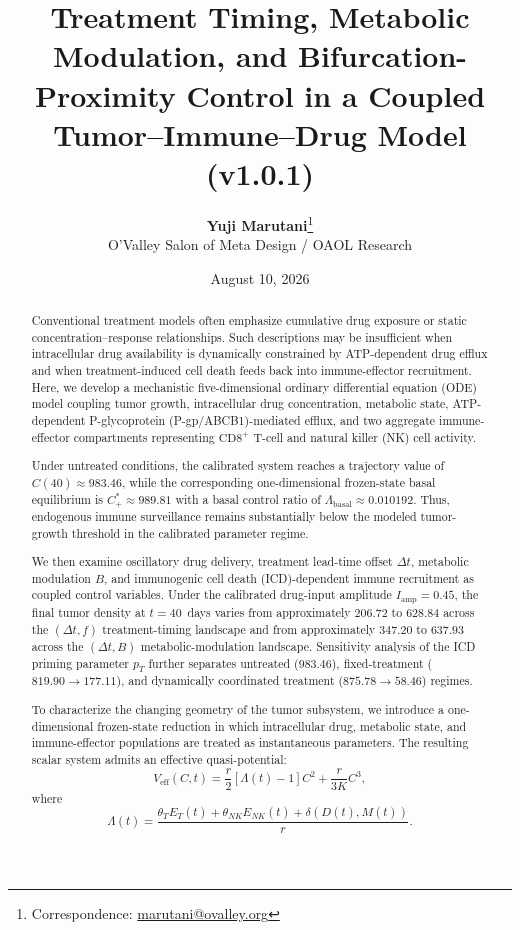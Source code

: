\documentclass[11pt,a4paper]{article}
\title{\textbf{Treatment Timing, Metabolic Modulation, and Bifurcation-Proximity Control in a Coupled Tumor--Immune--Drug Model (v1.0.1)}}
\author{
    \textbf{Yuji Marutani}\thanks{Correspondence: \href{mailto:marutani@ovalley.org}{marutani@ovalley.org}} \\
    \small O'Valley Salon of Meta Design / OAOL Research
}
\date{August 10, 2026}
\begin{document}
\maketitle

\begin{abstract}
Conventional treatment models often emphasize cumulative drug exposure or static concentration--response relationships. Such descriptions may be insufficient when intracellular drug availability is dynamically constrained by ATP-dependent drug efflux and when treatment-induced cell death feeds back into immune-effector recruitment. Here, we develop a mechanistic five-dimensional ordinary differential equation (ODE) model coupling tumor growth, intracellular drug concentration, metabolic state, ATP-dependent P-glycoprotein (P-gp/ABCB1)-mediated efflux, and two aggregate immune-effector compartments representing $\text{CD8}^+$ T-cell and natural killer (NK) cell activity.

Under untreated conditions, the calibrated system reaches a trajectory value of $C(40) \approx 983.46$, while the corresponding one-dimensional frozen-state basal equilibrium is $C_+^* \approx 989.81$ with a basal control ratio of $\Lambda_{\text{basal}} \approx 0.010192$. Thus, endogenous immune surveillance remains substantially below the modeled tumor-growth threshold in the calibrated parameter regime.

We then examine oscillatory drug delivery, treatment lead-time offset $\Delta t$, metabolic modulation $B$, and immunogenic cell death (ICD)-dependent immune recruitment as coupled control variables. Under the calibrated drug-input amplitude $I_{\text{amp}} = 0.45$, the final tumor density at $t = 40$~days varies from approximately $206.72$ to $628.84$ across the $(\Delta t, f)$ treatment-timing landscape and from approximately $347.20$ to $637.93$ across the $(\Delta t, B)$ metabolic-modulation landscape. Sensitivity analysis of the ICD priming parameter $p_T$ further separates untreated ($983.46$), fixed-treatment ($819.90 \to 177.11$), and dynamically coordinated treatment ($875.78 \to 58.46$) regimes.

To characterize the changing geometry of the tumor subsystem, we introduce a one-dimensional frozen-state reduction in which intracellular drug, metabolic state, and immune-effector populations are treated as instantaneous parameters. The resulting scalar system admits an effective quasi-potential:
\begin{equation}
V_{\text{eff}}(C,t) = \frac{r}{2}\left[\Lambda(t)-1\right]C^2 + \frac{r}{3K}C^3,
\end{equation}
where
\begin{equation}
\Lambda(t) = \frac{\theta_T E_T(t) + \theta_{NK} E_{NK}(t) + \delta(D(t),M(t))}{r}.
\end{equation}


\end{abstract}
\end{document}
